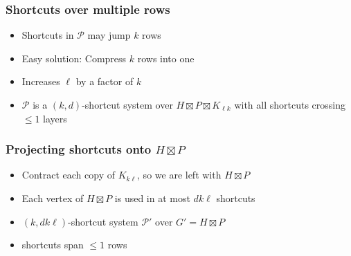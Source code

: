 \documentclass[xcolor=dvipsnames]{beamer}
\begin{document}
\begin{frame}
  \frametitle{Shortcuts over multiple rows}

  \begin{itemize}
    \item Shortcuts in $\mathcal{P}$ may jump $k$ rows
    \item<2-> Easy solution: Compress $k$ rows into one
  \end{itemize}
    \begin{center}
    \end{center}
  \begin{itemize}
    \item<3-> Increases $\ell$ by a factor of $k$
    \item<4-> $\mathcal{P}$ is a $(k,d)$-shortcut system over $H\boxtimes P\boxtimes K_{\ell k}$ with all shortcuts crossing $\le\!\! 1$ layers
  \end{itemize}
\end{frame}

\begin{frame}
  \frametitle{Projecting shortcuts onto $H\boxtimes P$}

  \begin{itemize}
    \item<2-> Contract each copy of $K_{k\ell}$, so we are left with $H\boxtimes P$
  \end{itemize}
    \begin{center}
    \end{center}
  \begin{itemize}
    \item<3-> Each vertex of $H\boxtimes P$ is used in at most $dk\ell$ shortcuts
    \item<4-> $(k,dk\ell)$-shortcut system $\mathcal{P'}$ over $G'=H\boxtimes P$
    \item<4-> shortcuts span $\le\!\!1$ rows
  \end{itemize}
\end{frame}
\end{document}
